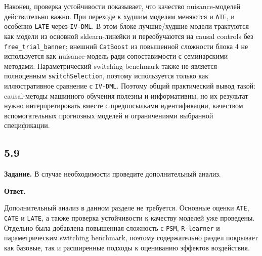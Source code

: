 \documentclass[11pt]{article}
\begin{document}
Наконец, проверка устойчивости показывает, что качество nuisance-моделей
действительно важно. При переходе к худшим моделям меняются и
\texttt{ATE}, и особенно \texttt{LATE} через \texttt{IV-DML}. В этом
блоке лучшие/худшие модели трактуются как модели из основной
sklearn-линейки и переобучаются на causal controls без
\texttt{free\_trial\_banner}; внешний \texttt{CatBoost} из повышенной
сложности блока 4 не используется как nuisance-модель ради
сопоставимости с семинарскими методами. Параметрический switching
benchmark также не является полноценным \texttt{switchSelection},
поэтому используется только как иллюстративное сравнение с
\texttt{IV-DML}. Поэтому общий практический вывод такой: causal-методы
машинного обучения полезны и информативны, но их результат нужно
интерпретировать вместе с предпосылками идентификации, качеством
вспомогательных прогнозных моделей и ограничениями выбранной
спецификации.

    \subsection{5.9}\label{section}

\textbf{Задание.} В случае необходимости проведите дополнительный
анализ.

\textbf{Ответ.}

Дополнительный анализ в данном разделе не требуется. Основные оценки
\texttt{ATE}, \texttt{CATE} и \texttt{LATE}, а также проверка
устойчивости к качеству моделей уже проведены. Отдельно была добавлена
повышенная сложность с \texttt{PSM}, \texttt{R-learner} и
параметрическим switching benchmark, поэтому содержательно раздел
покрывает как базовые, так и расширенные подходы к оцениванию эффектов
воздействия.


    
    
    
\end{document}

